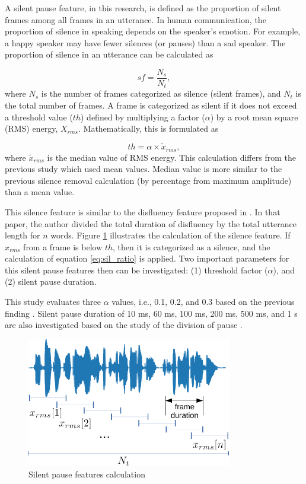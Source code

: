 A silent pause feature, in this research, is defined as the proportion of
silent frames among all frames in an utterance. In human communication, the
proportion of silence in speaking depends on the speaker's emotion. For
example, a happy speaker may have fewer silences (or pauses) than a sad
speaker. The proportion of silence in an utterance can be calculated as

\begin{equation}
  \label{eq:sil_ratio}
  sf = \frac{N_{s}}{N_{t}},
\end{equation}
where $N_s$ is the number of frames categorized as silence (silent frames), and
$N_t$ is the total number of frames. A frame is categorized as silent if it
does not exceed a threshold value ($th$) defined by multiplying a factor
($\alpha$) by a root mean square (RMS) energy, $X_{rms}$. Mathematically, this
is formulated as

\begin{equation}
 th = \alpha \times \tilde{x}_{rms},
\end{equation}
where $\tilde{x}_{rms}$ is the median value of RMS energy. This calculation
differs from the previous study \cite{Atmaja2020f} which used mean values.
Median value is more similar to the previous silence removal calculation
(by percentage from maximum amplitude) than a mean value. 

This silence feature is similar to the disfluency feature proposed in
\cite{moore2014word}. In that paper, the author divided the total duration of
disfluency by the total utterance length for $n$ words. Figure
\ref{fig:silence_fig} illustrates the calculation of the silence feature. If
$x_{rms}$ from a frame is below $th$, then it is categorized as a silence, and
the calculation of equation \ref{eq:sil_ratio} is applied. Two important
parameters for this silent pause features then can be investigated: (1)
threshold factor ($\alpha$), and (2) silent pause duration.

This study evaluates three $\alpha$ values, i.e., 0.1, 0.2, and 0.3 based on
the previous finding \cite{Atmaja2020f}. Silent pause duration of 10 ms, 60 ms,
100 ms, 200 ms, 500 ms, and 1 s are also investigated based on the study of the
division of pause \cite{Campione2002}.

\begin{figure}[htbp]
  \centering
  \includegraphics[width=0.8\textwidth]{../fig/silence_fig-crop.pdf}
  \caption{Silent pause features calculation}
  \label{fig:silence_fig}
\end{figure}

